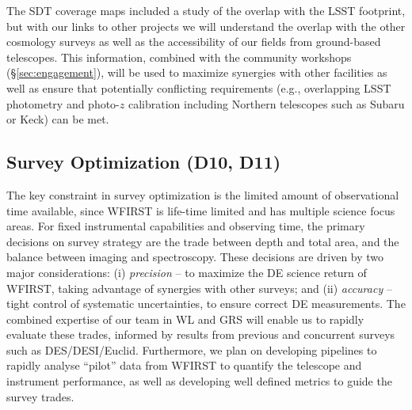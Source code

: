 The SDT coverage maps included a study of the overlap with the LSST footprint,
but with our links to other projects we will understand the overlap with
the other cosmology surveys as well as the accessibility
of our fields from ground-based telescopes. This information, combined with the
community workshops (\S\ref{sec:engagement}), will be used to maximize synergies with
other facilities as well as ensure that potentially conflicting requirements (e.g.,
overlapping LSST photometry and photo-$z$ calibration including Northern telescopes
such as Subaru or Keck) can be met.



\subsection{Survey Optimization (D10, D11)}
\label{sec:sur_opt}

The key constraint in survey optimization is the limited amount of observational time
available, since WFIRST is life-time limited and has multiple science focus areas.
For fixed instrumental capabilities and observing time, the primary
decisions on survey strategy are the trade between depth and total area, and
the balance between imaging and spectroscopy.
These decisions are driven by two major considerations:
(i) {\em precision} -- to maximize the DE science return of WFIRST, taking advantage of synergies with other surveys; and
(ii) {\em accuracy} -- tight control of systematic uncertainties, to ensure correct DE measurements.
The combined expertise of our team in WL and GRS will enable us to rapidly evaluate
these trades, informed by results from previous and concurrent surveys such as
DES/DESI/Euclid. Furthermore, we plan on developing pipelines to
rapidly analyse ``pilot'' data from WFIRST to quantify the telescope
and instrument performance, as well as developing well defined metrics to guide the survey trades.

